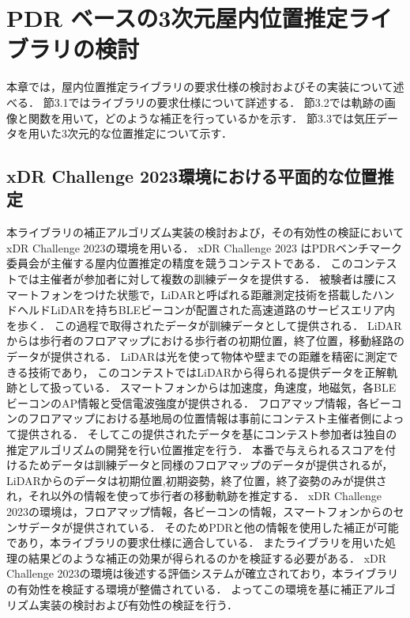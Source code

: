 
\chapter{PDR ベースの3次元屋内位置推定ライブラリの検討}
\thispagestyle{myheadings}
本章では，屋内位置推定ライブラリの要求仕様の検討およびその実装について述べる．
節3.1ではライブラリの要求仕様について詳述する．
節3.2では軌跡の画像と関数を用いて，どのような補正を行っているかを示す．
節3.3では気圧データを用いた3次元的な位置推定について示す．




\section{xDR Challenge 2023環境における平面的な位置推定}

本ライブラリの補正アルゴリズム実装の検討および，その有効性の検証においてxDR Challenge 2023\cite{xdr}の環境を用いる．
xDR Challenge 2023 はPDRベンチマーク委員会が主催する屋内位置推定の精度を競うコンテストである．
このコンテストでは主催者が参加者に対して複数の訓練データを提供する．
被験者は腰にスマートフォンをつけた状態で，LiDARと呼ばれる距離測定技術を搭載したハンドヘルドLiDARを持ちBLEビーコンが配置された高速道路のサービスエリア内を歩く．
この過程で取得されたデータが訓練データとして提供される．
LiDARからは歩行者のフロアマップにおける歩行者の初期位置，終了位置，移動経路のデータが提供される．
LiDARは光を使って物体や壁までの距離を精密に測定できる技術であり，
このコンテストではLiDARから得られる提供データを正解軌跡として扱っている．
スマートフォンからは加速度，角速度，地磁気，各BLEビーコンのAP情報と受信電波強度が提供される．
フロアマップ情報，各ビーコンのフロアマップにおける基地局の位置情報は事前にコンテスト主催者側によって提供される．
そしてこの提供されたデータを基にコンテスト参加者は独自の推定アルゴリズムの開発を行い位置推定を行う．
本番で与えられるスコアを付けるためデータは訓練データと同様のフロアマップのデータが提供されるが，
LiDARからのデータは初期位置,初期姿勢，終了位置，終了姿勢のみが提供され，それ以外の情報を使って歩行者の移動軌跡を推定する．
xDR Challenge 2023の環境は，フロアマップ情報，各ビーコンの情報，スマートフォンからのセンサデータが提供されている．
そのためPDRと他の情報を使用した補正が可能であり，本ライブラリの要求仕様に適合している．
またライブラリを用いた処理の結果どのような補正の効果が得られるのかを検証する必要がある．
xDR Challenge 2023の環境は後述する評価システムが確立されており，本ライブラリの有効性を検証する環境が整備されている．
よってこの環境を基に補正アルゴリズム実装の検討および有効性の検証を行う．

